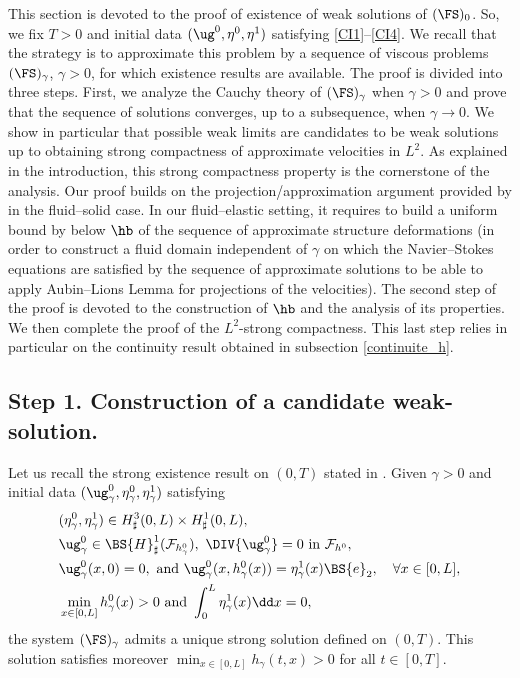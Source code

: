 This section is devoted to the proof of existence of weak solutions of $(\FS)_0$.
So, we fix $T>0$ and initial data $(\ug^0,\eta^0,\eta^1)$ satisfying \eqref{CI1}--\eqref{CI4}.
We recall that the strategy is to approximate this problem by a sequence of viscous problems $(\FS)_\gamma$, $\gamma>0$, for which existence results are available. The proof is divided into three steps. First, we analyze the Cauchy theory of $(\FS)_{\gamma}$ when $\gamma >0$ and prove that the sequence of solutions converges, up to a subsequence, when $\gamma \to 0$. We show in particular that possible weak limits are candidates to be weak solutions up to obtaining
strong compactness of approximate velocities in $L^2$. As explained in the introduction, this strong compactness property is the cornerstone of the analysis. Our proof builds on the projection/approximation argument provided by \cite{SanMartin-Starovoitov-Tucsnak}
in the fluid--solid case. In our fluid--elastic setting, it requires to build a uniform bound by below $\hb$ of the sequence
of approximate structure deformations (in order to construct a fluid domain independent of $\gamma$ on which the Navier--Stokes equations are satisfied by the sequence of approximate solutions to be able to apply Aubin--Lions Lemma for projections of the velocities). The second step of the proof is devoted to the construction of $\hb$ and
the analysis of its properties. We then complete the proof of the $L^2$-strong compactness. This last step relies in particular on the continuity result obtained in subsection \ref{continuite_h}.

\subsection{Step 1. Construction of a candidate weak-solution.}
\label{sec:proof1}
Let us recall the strong existence result on $(0,T)$ stated in \cite[Th.\,1]{Grandmont-Hillairet}.
Given $\gamma>0$ and initial data $(\ug_\gamma^{0},\eta_\gamma^{0},\eta_\gamma^{1})$ satisfying
\begin{align}
&(\eta_\gamma^{0},\eta_\gamma^{1})\in H^{3}_{\sharp}(0,L)\times H^{1}_{\sharp}(0,L),\label{CI-gamma1}\\
&\ug_\gamma^{0}\in \BS{H}_{\sharp}^{1}(\mathcal{F}_{h_{\gamma}^{0}}),\ \DIV{\ug_\gamma^{0}}=0\text{ in }\mathcal{F}_{h^{0}},\label{CI-gamma2}\\
&\ug_\gamma^{0}(x,0)=0, \text{ and }\ug_\gamma^{0}(x,h_\gamma^{0}(x))=\eta_\gamma^{1}(x)\BS{e}_{2},\quad \forall x\in [0,L],\label{CI-gamma3}\\
&\min_{x\in[0,L]}h_\gamma^{0}(x)>0\text{ and }\int_{0}^{L}\eta_\gamma^{1}(x)\dd x=0,\label{CI-gamma4}
\end{align}
the system $(\FS)_{\gamma}$ admits a unique strong solution defined on $(0, T)$. This solution satisfies moreover $\min_{x\in [0, L]} h_\gamma(t,x) >0$ for all $t\in [0, T]$.

